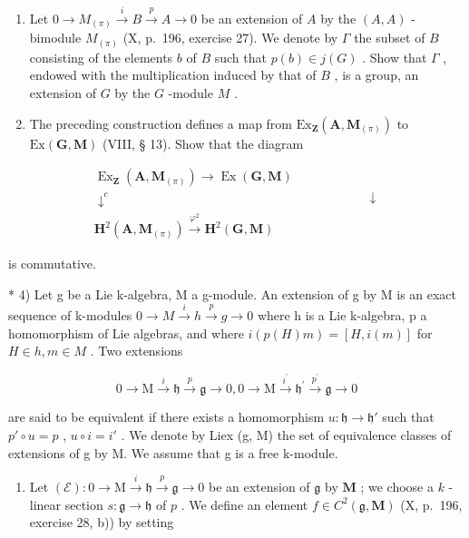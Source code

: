 \begin{enumerate}
\def\labelenumi{\alph{enumi})}
\item
  Let \(0 \to M_{(\pi)} \xrightarrow{i} B \xrightarrow{p} A \to 0\) be an extension of \(A\) by the \((A, A)\) -bimodule \(M_{(\pi)}\) (X, p.~196, exercise 27). We denote by \(\Gamma\) the subset of \(B\) consisting of the elements \(b\) of \(B\) such that \(p(b) \in j(G)\) . Show that \(\Gamma\) , endowed with the multiplication induced by that of \(B\) , is a group, an extension of \(G\) by the \(G\) -module \(M\) .
\item
  The preceding construction defines a map from \(\mathrm{Ex}_{\mathbf{Z}}(\mathbf{A},\mathbf{M}_{(\pi)})\) to \(\mathrm{Ex}(\mathbf{G},\mathbf{M})\) (VIII, § 13). Show that the diagram
\end{enumerate}

\[
\begin{array}{c} \operatorname{Ex} _ {\mathbf {Z}} (\mathbf {A}, \mathbf {M} _ {(\pi)}) \to \operatorname{Ex} (\mathbf {G}, \mathbf {M}) \\ \downarrow^ {c} \qquad \qquad \qquad \qquad \qquad \qquad \qquad \qquad \qquad \qquad \downarrow \\ \mathbf {H} ^ {2} (\mathbf {A}, \mathbf {M} _ {(\pi)}) \xrightarrow {\varphi^ {2}} \mathbf {H} ^ {2} (\mathbf {G}, \mathbf {M}) \end{array}
\]

is commutative.

* 4) Let g be a Lie k-algebra, M a g-module. An extension of g by M is an exact sequence of k-modules \(0 \rightarrow M \xrightarrow{i} h \xrightarrow{p} g \rightarrow 0\) where h is a Lie k-algebra, p a homomorphism of Lie algebras, and where \(i(p(H)m) = [H, i(m)]\) for \(H \in h, m \in M\) . Two extensions

\[
0 \rightarrow \mathrm{M} \stackrel {i} {\rightarrow} \mathfrak {h} \stackrel {p} {\rightarrow} \mathfrak {g} \rightarrow 0, 0 \rightarrow \mathrm{M} \stackrel {i ^ {\prime}} {\rightarrow} \mathfrak {h} ^ {\prime} \stackrel {p ^ {\prime}} {\rightarrow} \mathfrak {g} \rightarrow 0
\]

are said to be equivalent if there exists a homomorphism \(u: \mathfrak{h} \to \mathfrak{h}'\) such that \(p' \circ u = p\) , \(u \circ i = i'\) . We denote by Liex (g, M) the set of equivalence classes of extensions of g by M. We assume that g is a free k-module.

\begin{enumerate}
\def\labelenumi{\alph{enumi})}
\tightlist
\item
  Let \((\mathcal{E}):0\to \mathrm{M}\stackrel {i}{\to}\mathfrak{h}\stackrel {p}{\to}\mathfrak{g}\to 0\) be an extension of \(\mathfrak{g}\) by \(\mathbf{M}\) ; we choose a \(k\) -linear section \(s:\mathfrak{g}\to \mathfrak{h}\) of \(p\) . We define an element \(f\in C^2 (\mathfrak{g},\mathbf{M})\) (X, p.~196, exercise 28, b)) by setting
\end{enumerate}

